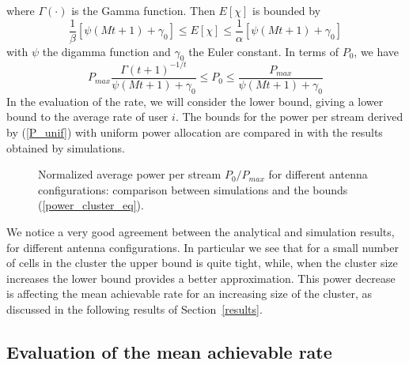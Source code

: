 where $\Gamma (\cdot)$ is the Gamma function.
Then $E[\chi]$ is bounded by  
\begin{equation}
 \frac{1}{\beta}\left[\psi(Mt+1)+\gamma_0\right] \leq E[\chi]\leq \frac{1}{\alpha}\left[\psi(Mt+1)+\gamma_0\right]\label{power_cluster_eq}
\end{equation}
with $\psi$ the digamma function and $\gamma_0$ the Euler constant. In terms of $P_0$, we have
\begin{equation}
 P_{max}\frac{\Gamma(t+1)^{-1/t}}{\psi(Mt+1)+\gamma_0}\leq P_0\leq  \frac{P_{max}}{\psi(Mt+1)+\gamma_0}\label{P_unif}
\end{equation}
In the evaluation of the rate, we will consider the lower bound, giving a lower bound to the average rate of user $i$.
The bounds for the power per stream derived by (\ref{P_unif}) with uniform power allocation are compared in  with the results obtained by simulations.
\begin{figure}[h]
\begin{center}
\begin{small}
\end{small}
\end{center}
\vspace*{-2.4mm}\caption{Normalized average power per stream $P_0/P_{max}$ for different antenna
configurations: comparison between simulations and the bounds (\ref{power_cluster_eq}).}\label{power_cluster}
\end{figure}
 We notice a very good agreement between the analytical and simulation results, for different antenna configurations.
In particular we see that for a small number of cells in the cluster the upper bound is quite tight, while, when the cluster size increases the lower bound provides a better approximation. 
This power decrease is affecting the mean achievable rate for an increasing size of the cluster, as discussed in the following results of Section~\ref{results}.

\subsection{Evaluation of the mean achievable rate}

